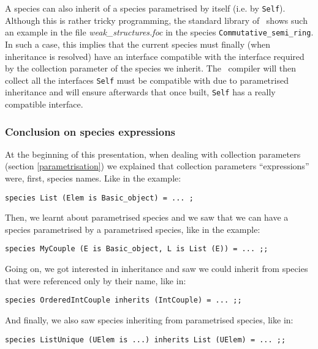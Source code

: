A species can also inherit of a species parametrised by itself
(i.e. by {\tt Self}). Although this is rather tricky programming, the
standard library of \focal\ shows such an example in the file
{\em weak\_structures.foc} in the species
{\tt Commutative\_semi\_ring}. In such a case, this implies that the
current species must finally (when inheritance is resolved) have an
interface compatible with the interface required by the collection
parameter of the species we inherit. The \focal\ compiler will then
collect all the interfaces {\tt Self} must be compatible with due to
parametrised inheritance and will ensure afterwards that once built,
{\tt Self} has a really compatible interface.



\subsubsection{Conclusion on species expressions}
At the beginning of this presentation, when dealing with collection
parameters (section \ref{parametrisation}) we explained that
collection parameters ``expressions'' were, first, species names. Like
in the example:
{\scriptsize
\begin{lstlisting}
species List (Elem is Basic_object) = ... ;
\end{lstlisting}
}

Then, we learnt about parametrised species and we saw that we can have
a species parametrised by a parametrised species, like in the example:
{\scriptsize
\begin{lstlisting}
species MyCouple (E is Basic_object, L is List (E)) = ... ;;
\end{lstlisting}
}

Going on, we got interested in inheritance and saw we could inherit
from species that were referenced only by their name, like in:
{\scriptsize
\begin{lstlisting}
species OrderedIntCouple inherits (IntCouple) = ... ;;
\end{lstlisting}
}

And finally, we also saw species inheriting from parametrised
species, like in:
{\scriptsize
\begin{lstlisting}
species ListUnique (UElem is ...) inherits List (UElem) = ... ;;
\end{lstlisting}
}

